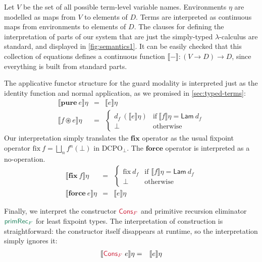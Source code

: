 \documentclass[natbib]{sigplanconf}
\newcommand{\cons}[1]{\textcolor{cons}{\textsf{#1}}}
\newcommand{\elim}[1]{\textcolor{elim}{\textsf{#1}}}
\newcommand{\kw}[1]{\textbf{#1}}
\newcommand{\sem}[1]{\llbracket #1 \rrbracket}
\newcommand{\semCons}[1]{\mathsf{#1}}
\begin{document}
Let $V$ be the set of all possible term-level variable
names. Environments $\eta$ are modelled as maps from $V$ to elements
of $D$. Terms are interpreted as continuous maps from environments to
elements of $D$. The clauses for defining the interpretation of parts
of our system that are just the simply-typed $\lambda$-calculus are
standard, and displayed in \autoref{fig:semantics1}. It can be easily
checked that this collection of equations defines a continuous
function $\sem{-} : (V \to D) \to D$, since everything is built from
standard parts.

The applicative functor structure for the guard modality is
interpreted just as the identity function and normal application, as
we promised in \autoref{sec:typed-terms}:
\begin{eqnarray*}
  \sem{\kw{pure}\ e}\eta & = & \sem{e}\eta \\
  \sem{f \circledast e}\eta & = & \left\{
    \begin{array}{ll}
      d_f\ (\sem{e}\eta) & \textrm{if}\ \sem{f}\eta = \semCons{Lam}\ d_f \\
      \bot & \textrm{otherwise}
    \end{array}
  \right.
\end{eqnarray*}
Our interpretation simply translates the $\kw{fix}$ operator as the
usual fixpoint operator $\mathrm{fix}\ f = \bigsqcup_n f^n(\bot)$ in
$\mathrm{DCPO}_\bot$. The $\kw{force}$ operator is interpreted as a
no-operation.
\begin{eqnarray*}
  \sem{\kw{fix}\ f}\eta & = &
  \left\{
    \begin{array}{ll}
      \mathrm{fix}\ d_f & \textrm{if }\sem{f}\eta = \semCons{Lam}\ d_f \\
      \bot & \textrm{otherwise}
    \end{array}
  \right.\\
  \sem{\kw{force}\ e}\eta & = & \sem{e}\eta
\end{eqnarray*}

Finally, we interpret the constructor $\cons{Cons$_F$}$ and primitive
recursion eliminator $\elim{primRec$_F$}$ for least fixpoint
types. The interpretation of construction is straightforward: the
constructor itself disappears at runtime, so the interpretation simply
ignores it:
\begin{eqnarray*}
  \sem{\cons{Cons$_F$}\ e}\eta & = & \sem{e}\eta
\end{eqnarray*}
\end{document}
